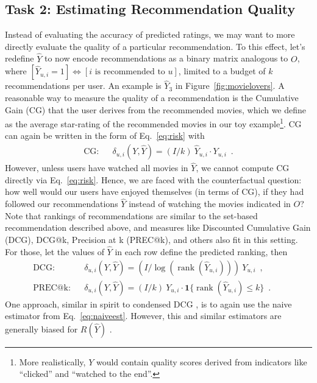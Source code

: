 \documentclass{article}
\DeclareMathOperator{\rank}{rank}
\newcommand{\user}{u}                       %
\newcommand{\movie}{i}                      %
\newcommand{\movies}{I}                     %
\newcommand{\ytrue}{Y}                      %
\newcommand{\ytrueelem}[1]{\ytrue_{#1}}
\newcommand{\ytrueum}{\ytrueelem{\user,\movie}}
\newcommand{\ypred}{\hat{Y}}                %
\newcommand{\ypredelem}[1]{\ypred_{#1}}
\newcommand{\ypredum}{\ypredelem{\user,\movie}}
\newcommand{\loss}[3]{\delta_{#1}(#2,#3)}   %
\newcommand{\lossum}{\loss{\user,\movie}{\ytrue}{\ypred}}
\newcommand{\obs}{O}                        %
\newcommand{\risk}[1]{R(#1)}                %
\newcommand{\risky}{\risk{\ypred}}
\begin{document}
\subsection{Task 2: Estimating Recommendation Quality}
Instead of evaluating the accuracy of predicted ratings, we may want to more directly evaluate the quality of a particular recommendation. To this effect, let's redefine $\ypred$ to now encode recommendations as a binary matrix analogous to $\obs$, where $[\ypredum=1] \Leftrightarrow [\movie \mbox{ is recommended to } \user]$,
limited to a budget of $k$ recommendations per user. An example is $\ypred_3$ in Figure~\ref{fig:movielovers}. A reasonable way to measure the quality of a recommendation is the Cumulative Gain (CG) that the user derives from the recommended movies, which we define as the average star-rating of the recommended movies in our toy example\footnote{More realistically, $\ytrue$ would contain quality scores derived from indicators like ``clicked'' and ``watched to the end''.}. CG can again be written in the form of Eq.~\eqref{eq:risk} with
\begin{eqnarray}
\mbox{CG:} && \lossum=(\movies / k) \: \ypredum \cdot \ytrueum  \enspace.
\end{eqnarray}
However, unless users have watched all movies in $\ypred$, we cannot compute CG directly via Eq.~\eqref{eq:risk}. Hence, we are faced with the counterfactual question: how well would our users have enjoyed themselves (in terms of CG), if they had followed our recommendations $\ypred$ instead of watching the movies indicated in $\obs$? Note that rankings of recommendations are similar to the set-based recommendation described above, and measures like Discounted Cumulative Gain (DCG), DCG@k, Precision at k (PREC@k), and others \cite{aslam2006statistical,yilmaz2008simple} also fit in this setting. For those, let the values of $\ypred$ in each row define the predicted ranking, then
\begin{eqnarray}
\mbox{DCG:} && \!\!\!\!\!\!\!\!\!\!\!\lossum\!=\!(\movies / \log(\rank(\ypredum)))\:\ytrueum \enspace,\\
\mbox{PREC@k:} && \!\!\!\!\!\!\!\!\!\!\!\lossum\!=\!(\movies / k)\:\ytrueum\!\cdot\! \mathbf{1}\!\{\rank(\!\ypredum\!) \!\leq\! k\}\enspace .\:\:\:\:\:\:\:
\end{eqnarray}
One approach, similar in spirit to condensed DCG \cite{sakai2007alternatives}, is to again use the naive estimator from Eq.~\eqref{eq:naiveest}. 
However, this and similar estimators are generally biased for $\risky$ \cite{pradel2012ranking,Steck/13}.
\end{document}
